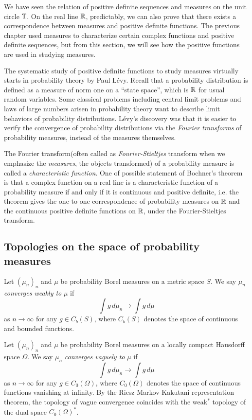 \documentclass[12pt]{article}
\begin{document}
We have seen the relation of positive definite sequences and measures on the unit circle $\mathbb{T}$.
On the real line $\mathbb{R}$, predictably, we can also prove that there exists a correspondence between measures and positive definite functions.
The previous chapter used measures to characterize certain complex functions and positive definite sequences, but from this section, we will see how the positive functions are used in studying measures.

The systematic study of positive definite functions to study measures virtually starts in probability theory by Paul L\'evy.
Recall that a probability distribution is defined as a measure of norm one on a ``state space'', which is $\mathbb{R}$ for usual random variables.
Some classical problems including central limit problems and laws of large numbers arisen in probability theory want to describe limit behaviors of probability distributions.
L\'evy's discovery was that it is easier to verify the convergence of probability distributions via the \emph{Fourier transforms} of probability measures, instead of the measures themselves.

The Fourier transform(often called as \emph{Fourier-Stieltjes} transform when we emphasize the \emph{measures}, the objects transformed) of a probability measure is called a \emph{characteristic function}.
One of possible statement of Bochner's theorem is that a complex function on a real line is a characteristic function of a probability measure if and only if it is continuous and positive definite, i.e. the theorem gives the one-to-one correspondence of probability measures on $\mathbb{R}$ and the continuous positive definite functions on $\mathbb{R}$, under the Fourier-Stieltjes transform.



\subsection{Topologies on the space of probability measures}


\begin{defn}
Let $(\mu_n)_n$ and $\mu$ be probability Borel measures on a metric space $S$.
We say $\mu_n$ \emph{converges weakly to} $\mu$ if
\[\int g\,d\mu_n\to\int g\,d\mu\]
as $n\to\infty$ for any $g\in C_b(S)$, where $C_b(S)$ denotes the space of continuous and bounded functions.
\end{defn}

\begin{defn}
Let $(\mu_n)_n$ and $\mu$ be probability Borel measures on a locally compact Hausdorff space $\Omega$.
We say $\mu_n$ \emph{converges vaguely to} $\mu$ if
\[\int g\,d\mu_n\to\int g\,d\mu\]
as $n\to\infty$ for any $g\in C_0(\Omega)$, where $C_0(\Omega)$ denotes the space of continuous functions vanishing at infinity.
By the Riesz-Markov-Kakutani representation theorem, the topology of vague convergence coincides with the weak$^*$ topology of the dual space $C_0(\Omega)^*$.
\end{defn}
\end{document}

